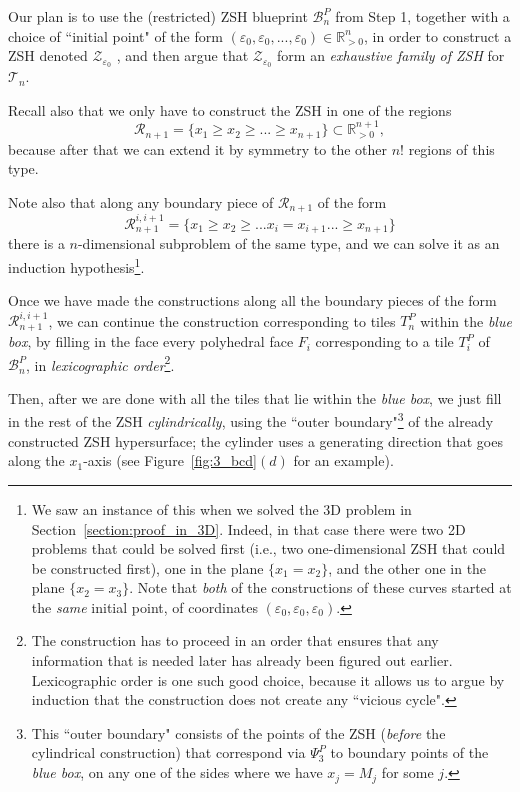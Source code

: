 \documentclass[12pt,letterpaper]{article}
\newcommand{\R}{\mathcal{R}}
\newcommand{\T}{\mathcal{T}}
\newcommand{\B}{\mathcal{B}}
\newcommand{\Z}{\mathcal{Z}}
\newcommand{\RRp}{\mathbb{R}_{>0}}
\newcommand{\RRpn}{\mathbb{R}_{>0}^n}
\newcommand{\eps}{\varepsilon}
\begin{document}
Our plan is to use the (restricted) ZSH blueprint $\B_n^P$ from  Step 1, together with a choice of ``initial point" of the form $(\eps_0, \eps_0, ..., \eps_0) \in \RRpn$, in order to construct a ZSH denoted $\Z_{\eps_0}$ , and then argue that  $\Z_{\eps_0}$ form an {\em exhaustive family of ZSH} for $\T_n$.

Recall also that we only have to construct the ZSH in one of the regions 
$$
\R_{n+1} = \{  x_1 \ge x_2 \ge ... \ge x_{n+1}  \} \subset \RRp^{n+1},
$$
because after that we can extend it by symmetry to the other $n!$ regions of this type.

Note also that along any boundary piece of $\R_{n+1}$ of the form 
$$
\R_{n+1}^{i,i+1} = \{  x_1 \ge x_2 \ge ... x_i = x_{i+1}  ... \ge x_{n+1}  \} 
$$
there is a $n$-dimensional subproblem of the same type, and we can solve it as an induction hypothesis\footnote{We saw an instance of this when we solved the 3D problem in Section~\ref{section:proof_in_3D}. Indeed, in that case there were two 2D problems that could be solved first (i.e., two one-dimensional ZSH that could be constructed first), one in the plane $\{ x_1 = x_2 \}$, and the other one in the plane $\{ x_2 = x_3 \}$. Note that {\em both} of the constructions of these curves started at the {\em same}  initial point, of coordinates $(\eps_0, \eps_0, \eps_0)$.}.  

Once we have made the constructions along all the boundary pieces of the form $\R_{n+1}^{i,i+1}$, we can continue the construction corresponding to tiles $T_n^P$ within the  {\em blue box}, by filling in the face every polyhedral face $F_i$ corresponding to a tile $T_i^P$ of $\B_n^P$, in {\em lexicographic order}\footnote{The construction has to proceed in  an  order that ensures that  any information that is needed later has already been figured out earlier. Lexicographic order is one such good choice, because it allows us to argue by induction that the construction does not create any ``vicious cycle".}. 

Then, after we are done with all the tiles that lie within the {\em blue box}, we just fill in the rest of the ZSH {\em cylindrically}, using the ``outer boundary"\footnote{This ``outer boundary" consists of the points of the ZSH ({\em before} the cylindrical construction) that correspond via $\Psi_3^P$ to boundary points of the {\em blue box}, on any one of the sides where we have $x_j = M_j$ for some $j$.} of the already constructed ZSH hypersurface; the cylinder uses a generating direction that goes along the  $x_1$-axis (see Figure~\ref{fig:3_bcd}$(d)$ for an example).
\end{document}
